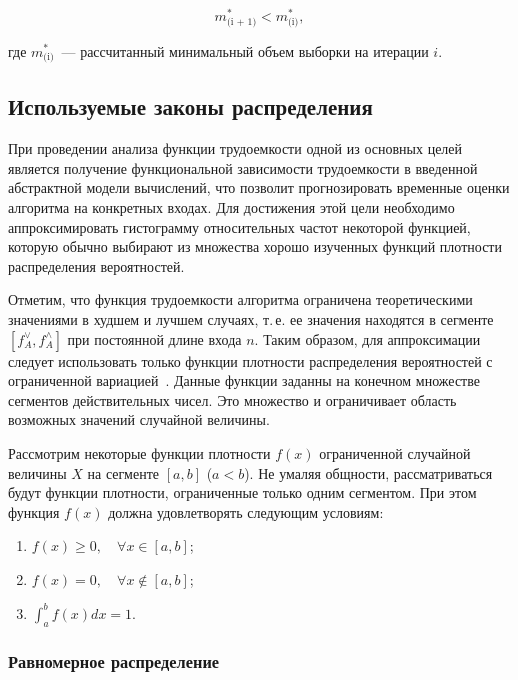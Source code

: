\documentclass[a4paper, article, 14pt]{extarticle}
\begin{document}
\begin{equation}\label{eq:selection_size_stop}
	m^*_\text{(i + 1)} < m^*_\text{(i)},
\end{equation}

\noindent где $m^*_\text{(i)}$~--- рассчитанный минимальный объем выборки на итерации $i$.

\subsection{Используемые законы распределения}\label{sec:using_distribution}

При проведении анализа функции трудоемкости одной из основных целей является получение функциональной зависимости трудоемкости в введенной абстрактной модели вычислений, что позволит прогнозировать временные оценки алгоритма на конкретных входах. Для достижения этой цели необходимо аппроксимировать гистограмму относительных частот некоторой функцией, которую обычно выбирают из множества хорошо изученных функций плотности распределения вероятностей.

Отметим, что функция трудоемкости алгоритма ограничена теоретическими значениями в худшем и лучшем случаях, т.\,е. ее значения находятся в сегменте $[f_A^\vee, f_A^\wedge]$ при постоянной длине входа $n$. Таким образом, для аппроксимации следует использовать только функции плотности распределения вероятностей с ограниченной вариацией~\cite{petrushyn_ulyanov_definitions}. Данные функции заданны на конечном множестве сегментов действительных чисел. Это множество и ограничивает область возможных значений случайной величины.

Рассмотрим некоторые функции плотности $f(x)$ ограниченной случайной величины $X$ на сегменте $[a, b]$ ($a < b$). Не умаляя общности, рассматриваться будут функции плотности, ограниченные только одним сегментом. При этом функция $f(x)$ должна удовлетворять следующим условиям:

\begin{enumerate}
	\item $f(x) \geq 0, \quad \forall x \in [a, b]$;

	\item $f(x) = 0, \quad \forall x \notin [a, b]$;

	\item $\int_{a}^{b}{f(x) dx} = 1$.
\end{enumerate}

\subsubsection{Равномерное распределение}\label{sec:uniform_distribtuion}
\end{document}

